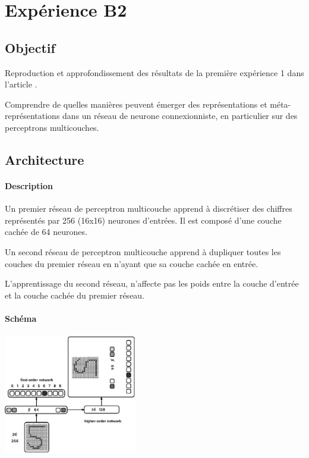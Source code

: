\section{Expérience B2} \label{expB2}
  \subsection{Objectif}
    Reproduction et approfondissement des résultats de la première expérience 1 dans l'article 
    \cite{Cleeremans_2007}. 

  
  
    Comprendre de quelles manières peuvent émerger des représentations et méta-représentations dans 
    un réseau de neurone connexionniste, en particulier sur des perceptrons multicouches.
  
  
  \subsection{Architecture}
    \paragraph{Description}
      Un premier réseau de perceptron multicouche apprend à discrétiser des chiffres représentés
      par 256 (16x16) neurones d'entrées. Il est composé d'une couche cachée de 64 neurones.
      
      Un second réseau de perceptron multicouche apprend à dupliquer toutes les couches du premier
      réseau en n'ayant que sa couche cachée en entrée.
      
      L'apprentissage du second réseau, n'affecte pas les poids entre la couche d'entrée et la 
      couche cachée du premier réseau.

    \paragraph{Schéma}
      \begin{center}
	\includegraphics[width=220px]{data/expA3/schema.png}
      \end{center}
      
